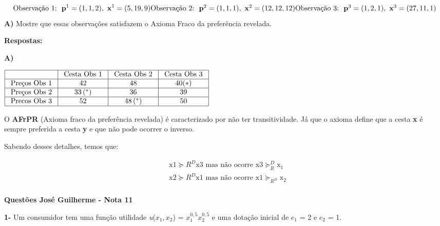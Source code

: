 \documentclass[a4paper, 12pt]{article} %
\begin{document}
\begin{flushleft}
\begin{equation}
\text{Observação 1:} \ \  \textbf{p}^{1} = (1,1,2), \ \textbf{x}^{1} = (5,19,9)
$$\\$$
\text{Observação 2:} \ \  \textbf{p}^{2} = (1,1,1), \ \textbf{x}^{2} = (12,12,12)
$$\\$$
\text{Observação 3:} \ \  \textbf{p}^{3} = (1,2,1), \ \textbf{x}^{3} = (27,11,1)
\end{equation}
\singlespacing
\textbf{A)} Mostre que essas observações satisfazem o Axioma Fraco da preferência revelada.

\singlespacing

\textbf{Respostas:}

\textbf{A)} 
\begin{center}

$\begin{array}{|l|c|c|c|}
	\hline & \text { Cesta Obs 1 } & \text { Cesta Obs 2 } & \text { Cesta Obs 3 } \\
	\hline \text { Preços Obs 1 } & 42 & 48 & 40(*) \\
	\hline \text { Preços Obs 2 } & 33\left(^{*}\right) & 36 & 39 \\
	\hline \text { Precos Obs 3 } & 52 & 48\left(^{*}\right) & 50 \\
	\hline
\end{array}$
\end{center}
\singlespacing
O \textbf{AFrPR} (Axioma fraco da preferência revelada) é caracterizado por não ter transitividade. Já que o axioma define que a cesta \textbf{x} é sempre preferida a cesta \textbf{y} e que não pode ocorrer o inverso.

Sabendo desses detalhes, temos que:

\begin{equation}
\begin{aligned}
&\mathrm{x}{1} \succeq{R}^{D} \mathrm{x}{3} \text { mas não ocorre } \mathrm{x}{3} \succeq_{R}^{D} \mathrm{x}_{1}\\
&\mathrm{x}{2} \succeq{R^{D}} \mathrm{x}{1} \text { mas não ocorre } \mathrm{x}{1} \succeq_{R^{D}} \mathrm{x}_{2}\\
\end{aligned}
\end{equation}

\singlespacing

\textbf{Questões José Guilherme - Nota 11}

\singlespacing

\textbf{1-} Um consumidor tem uma função utilidade \textit{u}($x_{1}, x_{2}$) = $x_{1}^{0,5}x_{2}^{0,5}$ e uma dotação inicial de $\textit{e}_{1}$ = 2 e $\textit{e}_{2}$ = 1.


\end{flushleft}
\end{document}
